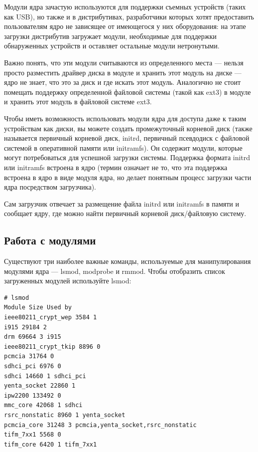 \documentclass[10pt]{book}
\begin{document}
Модули ядра зачастую используются для поддержки  съемных устройств (таких как USB), но также и в дистрибутивах, разработчики которых хотят предоставить пользователям ядро не зависящее от имеющегося у них оборудования: на этапе загрузки дистрибутив загружает модули, необходимые для поддержки обнаруженных устройств и оставляет остальные модули нетронутыми.

Важно понять, что эти модули считываются из определенного места — нельзя просто разместить драйвер диска в модуле и хранить этот модуль на диске — ядро не знает, что это за диск и где искать этот модуль. Аналогично не стоит помещать поддержку определенной файловой системы (такой как ext3) в модуле и хранить этот модуль в файловой системе ext3.

Чтобы иметь возможность использовать модули ядра для доступа даже к таким устройствам как диски, вы можете создать промежуточный корневой диск (также называется первичный корневой диск, initrd, первичный псевдодиск с файловой системой в оперативной памяти или initramfs). Он содержит модули, которые могут потребоваться для успешной загрузки системы. Поддержка формата initrd  или initramfs встроена в ядро (термин означает не то, что эта поддержка встроена в ядро в виде модуля ядра, но делает понятным процесс загрузки части ядра посредством загрузчика).

Сам загрузчик отвечает за размещение файла initrd или initramfs в памяти и сообщает ядру, где можно найти первичный корневой диск/файловую систему.

\subsection{Работа с модулями}

Существуют три наиболее важные команды, используемые для манипулирования модулями ядра — lsmod, modprobe и rmmod.
Чтобы отобразить список загруженных модулей используйте lsmod:

\vspace{3mm}
\begin{tcolorbox}
\begin{lstlisting}
# lsmod
Module Size Used by
ieee80211_crypt_wep 3584 1
i915 29184 2
drm 69664 3 i915
ieee80211_crypt_tkip 8896 0
pcmcia 31764 0
sdhci_pci 6976 0
sdhci 14660 1 sdhci_pci
yenta_socket 22860 1
ipw2200 133492 0
mmc_core 42068 1 sdhci
rsrc_nonstatic 8960 1 yenta_socket
pcmcia_core 31248 3 pcmcia,yenta_socket,rsrc_nonstatic
tifm_7xx1 5568 0
tifm_core 6420 1 tifm_7xx1
\end{lstlisting}
\end{tcolorbox}
\end{document}
